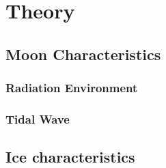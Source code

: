 \chapter{Theory}


\section{Moon Characteristics} %

\subsection{Radiation Environment} %


\subsection{Tidal Wave} %

\section{Ice characteristics} %


